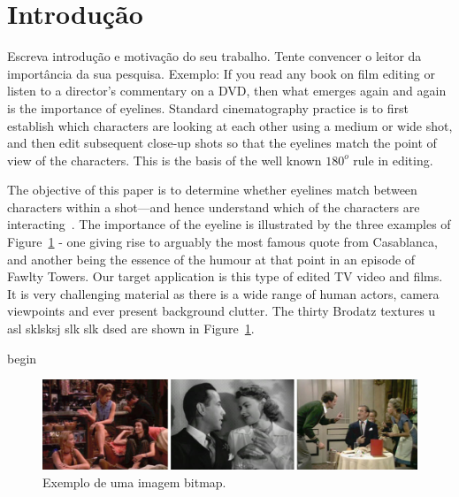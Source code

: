 \documentclass{classe_cn}                 %
\begin{document}

\section{Introdução}

Escreva introdução e motivação do seu trabalho. Tente convencer o leitor da importância da sua pesquisa. Exemplo: If you read any book on film editing or listen to a director's commentary on a DVD, then what emerges again and again is the importance of eyelines. Standard cinematography practice is to first establish which characters are looking at each other using a medium or wide shot, and then edit subsequent close-up shots so that the eyelines match the point of view of the characters. This is the basis of the well known $180^{o}$ rule in editing.

The objective of this paper is to determine whether eyelines match between characters within a shot—and hence understand which of the characters are interacting~\cite{Pressman:2007}. The importance of the eyeline is illustrated by the three examples of Figure~\ref{tag_figura_01} - one giving rise to arguably the most famous quote from Casablanca, and another being the essence of the humour at that point in an episode of Fawlty Towers. Our target application is this type of edited TV video and films. It is very challenging material as there is a wide range of human actors, camera viewpoints and ever present background clutter. The thirty Brodatz textures u asl sklsksj slk slk dsed are shown in Figure~\ref{tag_figura_01}.

begin
\begin{figure}[h!]
  \begin{center}
    \includegraphics[width=1.0 \textwidth]{figura01.jpg}
    \caption{Exemplo de uma imagem bitmap.} 
    \label{tag_figura_01}
  \end{center}
\end{figure}
\end{document}
